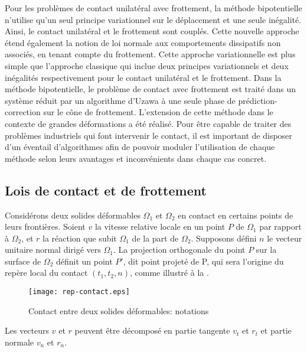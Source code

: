 Pour les problèmes de contact unilatéral avec frottement, la méthode bipotentielle n'utilise qu'un seul 
principe variationnel sur le déplacement et une seule inégalité. 
Ainsi, le contact unilatéral et le frottement sont couplés. 
Cette nouvelle approche étend également la notion de loi normale aux comportements dissipatifs non 
associés, en tenant compte du frottement. 
Cette approche variationnelle est plus simple que l'approche classique qui inclue deux principes variationnels 
et deux inégalités respectivement pour le contact unilatéral et le frottement. 
Dans la méthode bipotentielle, le problème de contact avec frottement est traité dans un système 
réduit par un algorithme d'Uzawa à une seule phase de prédiction-correction sur le cône de frottement. 
L'extension de cette méthode dans le contexte de grandes déformations a été réalisé.
Pour être capable de traiter des problèmes industriels qui font intervenir le contact, il est important 
de disposer d'un éventail d'algorithmes afin de pouvoir moduler l'utilisation de chaque méthode selon leurs 
avantages et inconvénients dans chaque cas concret. 

\medskip
\subsection{Lois de contact et de frottement}

Considérons deux solides déformables $\Omega_1$ et $\Omega_2$ en contact en certains
points de leurs frontières. 
Soient $v$ la vitesse relative locale en un point $P$ de $\Omega_1$ par rapport à $\Omega_2$, 
et $r$ la réaction que subit $\Omega_1$ de la part de $\Omega_2$. 
Supposons défini $n$ le vecteur unitaire normal dirigé vers $\Omega_1$. 
La projection orthogonale du point $P$ sur la surface de $\Omega_2$ définit un point $P'$, dit 
\og point projeté de P\fg{}, qui sera l'origine du repère local du contact $(t_1, t_2, n)$,
comme illustré à la .
\begin{figure}[htb]
\centerline{\texttt{[image: rep-contact.eps]}}
\caption{Contact entre deux solides déformables: notations}\label{Fig-rep-contact}
\end{figure}

Les vecteurs $v$ et $r$ peuvent être décomposé en partie tangente $v_t$ et $r_t$ et partie 
normale $v_n$ et $r_n$. 

